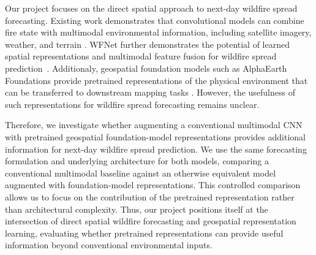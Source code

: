 \documentclass[sigconf]{acmart}
\begin{document}
Our project focuses on the direct spatial approach to next-day wildfire spread forecasting. Existing work demonstrates that convolutional models can combine fire state with multimodal environmental information, including satellite imagery, weather, and terrain \cite{KHENNOU2023100101, Shadrin_Illarionova_Gubanov_Evteeva_Mironenko_Levchunets_Belousov_Burnaev_2024}. WFNet further demonstrates the potential of learned spatial representations and multimodal feature fusion for wildfire spread prediction~\cite{Jiang_Qiao_Su_Li_Meng_Wu_Quan_Wang_Wang_2023}. Additionaly, geospatial foundation models such as AlphaEarth Foundations provide pretrained representations of the physical environment that can be transferred to downstream mapping tasks \cite{brown2025alphaearth}. However, the usefulness of such representations for wildfire spread forecasting remains unclear.

Therefore, we investigate whether augmenting a conventional multimodal CNN with pretrained geospatial foundation-model representations provides additional information for next-day wildfire spread prediction. We use the same forecasting formulation and underlying architecture for both models, comparing a conventional multimodal baseline against an otherwise equivalent model augmented with foundation-model representations. This controlled comparison allows us to focus on the contribution of the pretrained representation rather than architectural complexity. Thus, our project positions itself at the intersection of direct spatial wildfire forecasting and geospatial representation learning, evaluating whether pretrained representations can provide useful information beyond conventional environmental inputs.



 
\end{document}
